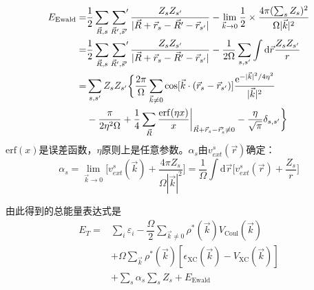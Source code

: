 	\begin{equation}
		\begin{aligned}
			E_{\textrm{Ewald}}=&\dfrac12\sum_{\vec R,s}\sideset{}{^{\prime}}\sum_{\vec R^{\prime},\vec s^{\prime}}\dfrac{Z_sZ_{s^{\prime}}}{|\vec R+\vec r_s-\vec R^{\prime}-\vec r_{s^{\prime}}|}-\lim_{\vec k\rightarrow0}\dfrac12\times\dfrac{4\pi(\sum_sZ_s)^2}{\Omega|\vec k|^2}\\
			=&\dfrac12\sum_{\vec R,s}\sideset{}{^{\prime}}\sum_{\vec R^{\prime},\vec s^{\prime}}\dfrac{Z_sZ_{s^{\prime}}}{|\vec R+\vec r_s-\vec R^{\prime}-\vec r_{s^{\prime}}|}-\dfrac1{2\Omega}\sum_{s,s^{\prime}}\int\mathrm{d}\vec r\dfrac{Z_sZ_{s^{\prime}}}r\\
			=&\sum_{s,s^{\prime}}Z_sZ_{s^{\prime}}\bigg\{\dfrac{2\pi}{\Omega}\sum_{\vec k\neq 0}\cos[\vec k\cdot(\vec r_s-\vec r_{s^{\prime}})]\dfrac{\mathrm{e}^{-|\vec k|^2/4\eta^2}}{|\vec k|^2}\\
			&-\dfrac{\pi}{2\eta^2\Omega}+\dfrac14\sum_{\vec R}\dfrac{\mathrm{erf}(\eta x)}x\bigg|_{\vec R+\vec r_s-\vec r_s^{\prime}\neq0}-\dfrac{\eta}{\sqrt{\pi}}\delta_{s,s^{\prime}}\bigg\}
		\end{aligned}
	\end{equation}
	$\mathrm{erf}(x)$是误差函数，$\eta$原则上是任意参数。$\alpha_s$由$v_{ext}^s(\vec r)$确定：
	\begin{equation}
		\alpha_s=\lim_{\vec k\rightarrow0}\bigg[v_{ext}^s(\vec k)+\dfrac{4\pi Z_s}{\Omega|\vec k|^2}\bigg]=\dfrac1{\Omega}\int\mathrm{d}\vec r\bigg[v_{ext}^s(\vec r)+\dfrac{Z_s}r\bigg]
	\end{equation}

由此得到的总能量表达式是
\begin{equation}
	\begin{aligned}
		E_T=&\sum_i\varepsilon_i-\dfrac{\Omega}2\sum_{\vec k\neq0}\rho^{\ast}(\vec k)V_{\mathrm{Coul}}(\vec k)\\
		&+\Omega\sum_{\vec k}\rho^{\ast}(\vec k)[\epsilon_{\mathrm{XC}}(\vec k)-V_{\mathrm{XC}}(\vec k)]\\
		&+\sum_s\alpha_s\sum_sZ_s+E_{\mathrm{Ewald}}
	\end{aligned}
\end{equation}

